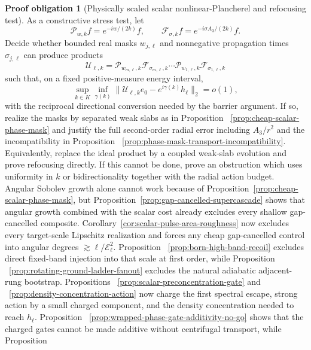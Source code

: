 \documentclass[11pt]{article}
\theoremstyle{definition}
\newtheorem{problem}[theorem]{Proof obligation}
\theoremstyle{remark}
\begin{document}
\begin{problem}[Physically scaled scalar nonlinear-Plancherel and refocusing test]
As a constructive stress test, let
\begin{equation}
 \mathcal P_{w,k}f=e^{-iw/(2k)}f,
 \qquad
 \mathcal F_{\sigma,k}f=e^{-i\sigma A_3/(2k)}f.
\end{equation}
Decide whether bounded real masks $w_{j,\ell}$ and nonnegative propagation
times $\sigma_{j,\ell}$ can produce products
\begin{equation}
 \mathcal U_{\ell,k}
 =\mathcal P_{w_{m,\ell},k}\mathcal F_{\sigma_{m,\ell},k}
  \cdots
  \mathcal P_{w_{1,\ell},k}\mathcal F_{\sigma_{1,\ell},k}
 \label{eq:phase-mask-product}
\end{equation}
such that, on a fixed positive-measure energy interval,
\begin{equation}
 \sup_{k\in K}\inf_{\gamma(k)}
 \|\mathcal U_{\ell,k}e_0-e^{i\gamma(k)}h_\ell\|_2=o(1),
 \label{eq:phase-mask-conversion-target}
\end{equation}
with the reciprocal directional conversion needed by the barrier argument.
If so, realize the masks by separated weak slabs as in Proposition
~\ref{prop:cheap-scalar-phase-mask} and justify the full second-order radial
error including $A_3/r^2$ and the incompatibility in Proposition
~\ref{prop:phase-mask-transport-incompatibility}.  Equivalently, replace the
ideal product by a coupled weak-slab evolution and prove refocusing directly.
 If this cannot be done, prove an obstruction which uses uniformity in $k$ or
 bidirectionality together with the radial action budget.  Angular Sobolev
growth alone cannot work because of Proposition~\ref{prop:cheap-scalar-phase-mask},
but Proposition~\ref{prop:gap-cancelled-supercascade} shows that angular growth
combined with the scalar cost already excludes every shallow gap-cancelled
composite.
 Corollary~\ref{cor:scalar-pulse-area-roughness} now excludes every
 target-scale Lipschitz realization and forces any cheap gap-cancelled control
 into angular degrees $\gtrsim\ell/\mathcal E_\ell^2$.  Proposition
 ~\ref{prop:born-high-band-recoil} excludes direct fixed-band injection into
 that scale at first order, while Proposition
 ~\ref{prop:rotating-ground-ladder-fanout} excludes the natural adiabatic
 adjacent-rung bootstrap.  Propositions
 ~\ref{prop:scalar-preconcentration-gate} and
 ~\ref{prop:density-concentration-action} now charge the first spectral escape,
 strong action by a small charged component, and the density concentration
 needed to reach $h_\ell$.  Proposition
 ~\ref{prop:wrapped-phase-gate-additivity-no-go} shows that the charged gates
 cannot be made additive without centrifugal transport, while Proposition

\end{problem}
\end{document}
